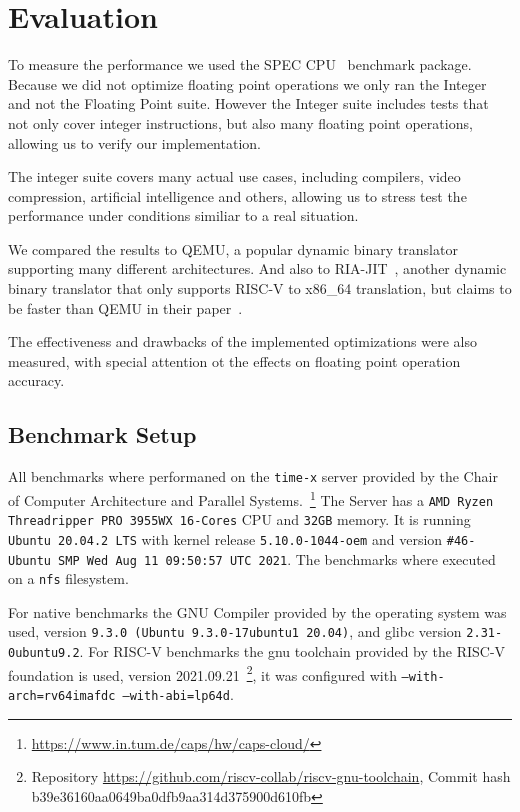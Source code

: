 \documentclass[course=eragp]{aspdoc}
\begin{document}
\section{Evaluation}\label{sec:evaluation}

To measure the performance we used the SPEC CPU~\cite{spec_cpu_2017} benchmark package.
Because we did not optimize floating point operations we only ran the Integer and not the Floating Point suite.
However the Integer suite includes tests that not only cover integer instructions, but also many floating point operations, allowing us to verify our implementation.

\par

The integer suite covers many actual use cases, including compilers, video compression, artificial intelligence and others, allowing us to stress
test the performance under conditions similiar to a real situation.

\par

We compared the results to QEMU, a popular dynamic binary translator supporting many different architectures.
And also to RIA-JIT~\cite{ria_jit_repo}, another dynamic binary translator that only supports RISC-V to x86\_64 translation, but claims to be faster than QEMU in their paper~\cite{ria_jit_paper}.

\par

The effectiveness and drawbacks of the implemented optimizations were also measured, with special attention ot the effects on floating point operation accuracy.

\subsection{Benchmark Setup}

All benchmarks where performaned on the \texttt{time-x} server provided by the Chair of Computer Architecture and Parallel Systems.~\footnote{\url{https://www.in.tum.de/caps/hw/caps-cloud/}} %
The Server has a \texttt{AMD Ryzen Threadripper PRO 3955WX 16-Cores} CPU and \texttt{32GB} memory.
It is running \texttt{Ubuntu 20.04.2 LTS} with kernel release \texttt{5.10.0-1044-oem} and version \texttt{\#46-Ubuntu SMP Wed Aug 11 09:50:57 UTC 2021}.
The benchmarks where executed on a \texttt{nfs} filesystem.

For native benchmarks the GNU Compiler provided by the operating system was used,
version \texttt{9.3.0 (Ubuntu 9.3.0-17ubuntu1~20.04)}, and glibc version \texttt{2.31-0ubuntu9.2}.
For RISC-V benchmarks the gnu toolchain provided by the RISC-V foundation is used, version 2021.09.21~\footnote{Repository \url{https://github.com/riscv-collab/riscv-gnu-toolchain}, Commit hash b39e36160aa0649ba0dfb9aa314d375900d610fb},
it was configured with \texttt{--with-arch=rv64imafdc --with-abi=lp64d}.
\end{document}
